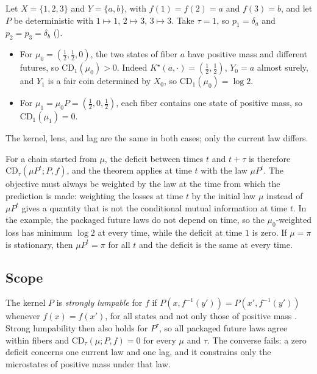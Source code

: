\begin{example}\label{ex:closure_current_law}
Let $X=\{1,2,3\}$ and $Y=\{a,b\}$, with $f(1)=f(2)=a$ and $f(3)=b$, and let $P$ be deterministic with $1\mapsto 1$, $2\mapsto 3$, $3\mapsto 3$.
Take $\tau=1$, so $p_1=\delta_a$ and $p_2=p_3=\delta_b$ ().
\begin{itemize}
  \item For $\mu_0=(\tfrac12,\tfrac12,0)$, the two states of fiber $a$ have positive mass and different futures, so $\mathrm{CD}_1(\mu_0)>0$. Indeed $K^\star(a,\cdot)=(\tfrac12,\tfrac12)$, $Y_0=a$ almost surely, and $Y_1$ is a fair coin determined by $X_0$, so $\mathrm{CD}_1(\mu_0)=\log 2$.
  \item For $\mu_1=\mu_0P=(\tfrac12,0,\tfrac12)$, each fiber contains one state of positive mass, so $\mathrm{CD}_1(\mu_1)=0$.
\end{itemize}
The kernel, lens, and lag are the same in both cases; only the current law differs.
\end{example}

For a chain started from $\mu$, the deficit between times $t$ and $t+\tau$ is therefore $\mathrm{CD}_\tau(\mu P^t;P,f)$, and the theorem applies at time $t$ with the law $\mu P^t$.
The objective must always be weighted by the law at the time from which the prediction is made: weighting the losses at time $t$ by the initial law $\mu$ instead of $\mu P^t$ gives a quantity that is not the conditional mutual information at time $t$.
In the example, the packaged future laws do not depend on time, so the $\mu_0$-weighted loss has minimum $\log 2$ at every time, while the deficit at time $1$ is zero.
If $\mu=\pi$ is stationary, then $\mu P^t=\pi$ for all $t$ and the deficit is the same at every time.

\subsection{Scope}

\begin{remark}
The kernel $P$ is \emph{strongly lumpable} for $f$ if $P(x,f^{-1}(y'))=P(x',f^{-1}(y'))$ whenever $f(x)=f(x')$, for all states and not only those of positive mass \citep{KemenySnell1960,Buchholz1994}.
Strong lumpability then also holds for $P^\tau$, so all packaged future laws agree within fibers and $\mathrm{CD}_\tau(\mu;P,f)=0$ for every $\mu$ and $\tau$.
The converse fails: a zero deficit concerns one current law and one lag, and it constrains only the microstates of positive mass under that law.
\end{remark}

